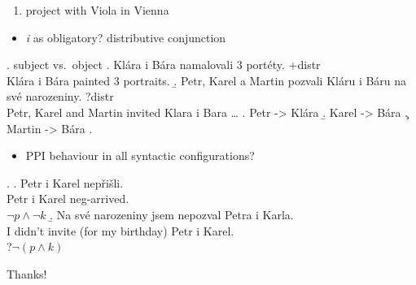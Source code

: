 \documentclass[ignorenonframetext,]{beamer}
\providecommand{\tightlist}{%
  \setlength{\itemsep}{0pt}\setlength{\parskip}{0pt}}
\begin{document}
\begin{frame}

\begin{enumerate}
\def\labelenumi{\arabic{enumi})}
\setcounter{enumi}{2}
\tightlist
\item
  project with Viola in Vienna
\end{enumerate}

\begin{itemize}
\tightlist
\item
  \emph{i} as obligatory? distributive conjunction
\end{itemize}

\ex. subject vs.~object \a. Klára i Bára namalovali 3 portéty.
\hfill +distr\\
Klára i Bára painted 3 portraits. \b. Petr, Karel a Martin pozvali Kláru
i Báru na své narozeniny. \hfill ?distr\\
Petr, Karel and Martin invited Klara i Bara \ldots{} \a. Petr
-\textgreater{} Klára \b. Karel -\textgreater{} Bára \c. Martin
-\textgreater{} Bára \z.

\end{frame}

\begin{frame}

\begin{itemize}
\tightlist
\item
  PPI behaviour in all syntactic configurations?
\end{itemize}

\ex. \a. Petr i Karel nepřišli.\\
Petr i Karel neg-arrived.\\
\(\neg p \wedge \neg k\) \b. Na své narozeniny jsem nepozval Petra i
Karla.\\
I didn't invite (for my birthday) Petr i Karel.\\
?\(\neg(p \wedge k)\)

\end{frame}

\begin{frame}

\begin{center}
\Huge Thanks!
\end{center}

\end{frame}
\end{document}
